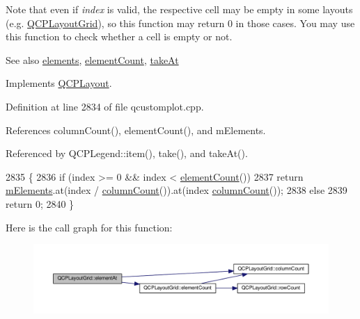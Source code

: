 Note that even if {\itshape index} is valid, the respective cell may be empty in some layouts (e.\+g. \hyperlink{class_q_c_p_layout_grid}{Q\+C\+P\+Layout\+Grid}), so this function may return 0 in those cases. You may use this function to check whether a cell is empty or not.

\begin{DoxySeeAlso}{See also}
\hyperlink{class_q_c_p_layout_grid_ae9e24e01552f6667b6d05b12a54a4caa}{elements}, \hyperlink{class_q_c_p_layout_grid_aa682b1d36660478f665bab3c64e956a9}{element\+Count}, \hyperlink{class_q_c_p_layout_grid_acc1277394ff8a6432e111ff9463e6375}{take\+At} 
\end{DoxySeeAlso}


Implements \hyperlink{class_q_c_p_layout_afa73ca7d859f8a3ee5c73c9b353d2a56}{Q\+C\+P\+Layout}.



Definition at line 2834 of file qcustomplot.\+cpp.



References column\+Count(), element\+Count(), and m\+Elements.



Referenced by Q\+C\+P\+Legend\+::item(), take(), and take\+At().


\begin{DoxyCode}
2835 \{
2836   \textcolor{keywordflow}{if} (index >= 0 && index < \hyperlink{class_q_c_p_layout_grid_aa682b1d36660478f665bab3c64e956a9}{elementCount}())
2837     \textcolor{keywordflow}{return} \hyperlink{class_q_c_p_layout_grid_a3577d3855bf8ad20ef9079291a49f397}{mElements}.at(index / \hyperlink{class_q_c_p_layout_grid_ac39074eafd148b82d0762090f258189e}{columnCount}()).at(index %
      \hyperlink{class_q_c_p_layout_grid_ac39074eafd148b82d0762090f258189e}{columnCount}());
2838   \textcolor{keywordflow}{else}
2839     \textcolor{keywordflow}{return} 0;
2840 \}
\end{DoxyCode}


Here is the call graph for this function\+:\nopagebreak
\begin{figure}[H]
\begin{center}
\leavevmode
\includegraphics[width=350pt]{class_q_c_p_layout_grid_a26849ee5c47b4c940e8d65e8462f1065_cgraph}
\end{center}
\end{figure}




